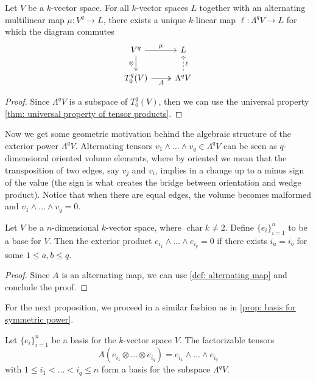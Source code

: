 \begin{proposition}
\label{prop: exterior power universal property}
Let \(V\) be a \(k\)-vector space. For all \(k\)-vector spaces \(L\) together
with an alternating multilinear map \(\mu: V^q \to L\), there exists a unique
\(k\)-linear map \(\ell: \Lambda^q V \to L\) for which the diagram commutes
\[
  \begin{tikzcd}
    V^q \ar[d, swap, "\otimes"] \ar[r, "\mu"]  &L \\
    T_0^q(V) \ar[r, swap, two heads, "A"]
    &\Lambda^q V \ar[u, dashed, swap, "\ell"]
  \end{tikzcd}
\]
\end{proposition}

\begin{proof}
Since \(\Lambda^q V\) is a subspace of \(T_0^q(V)\), then we can use the
universal property \cref{thm: universal property of tensor products}.
\end{proof}

Now we get some geometric motivation behind the algebraic structure of the
exterior power \(\Lambda^q V\). Alternating tensors \(v_1 \wedge \dots \wedge
v_q \in \Lambda^q V\) can be seen as \(q\)-dimensional oriented volume elements,
where by oriented we mean that the transposition of two edges, say \(v_j\) and
\(v_i\), implies in a change up to a minus sign of the value (the sign is what
creates the bridge between orientation and wedge product). Notice that when
there are equal edges, the volume becomes malformed and \(v_1 \wedge \dots
\wedge v_q = 0\).

\begin{proposition}
Let \(V\) be a \(n\)-dimensional \(k\)-vector space, where
\(\operatorname{char} k \neq 2\). Define \(\{e_i\}_{i=1}^n\) to be a base for
\(V\). Then the exterior product \(e_{i_1} \wedge \dots \wedge e_{i_q} = 0\)
if there exists \(i_a = i_b\) for some \(1 \leq a, b \leq q\).
\end{proposition}

\begin{proof}
Since \(A\) is an alternating map, we can use \cref{def: alternating map} and
conclude the proof.
\end{proof}

For the next proposition, we proceed in a similar fashion as in \cref{prop:
basis for symmetric power}.

\begin{proposition}
\label{prop: exterior power basis}
Let \(\{e_i\}_{i=1}^n\) be a basis for the \(k\)-vector space \(V\). The
factorizable tensors
\[
  A(e_{i_1} \otimes \dots \otimes e_{i_q}) = e_{i_1} \wedge \dots \wedge
  e_{i_q}
\]
with \(1 \leq i_1 < \dots < i_q \leq n\) form a basis for the subspace
\(\Lambda^q V\).
\end{proposition}

